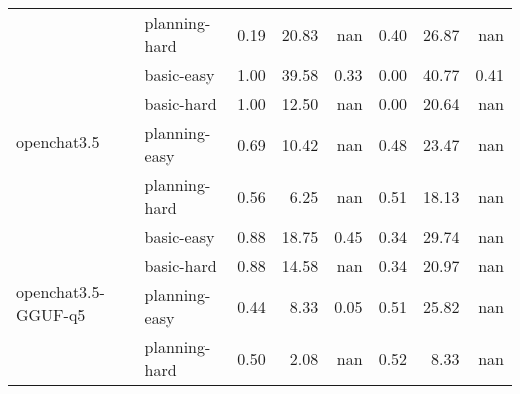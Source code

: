 \begin{tabular}{llrrrrrr}
 & planning-hard & 0.19 & 20.83 & nan & 0.40 & 26.87 & nan \\
\cline{1-8}
\multirow[c]{4}{*}{openchat3.5} & basic-easy & 1.00 & 39.58 & 0.33 & 0.00 & 40.77 & 0.41 \\
 & basic-hard & 1.00 & 12.50 & nan & 0.00 & 20.64 & nan \\
 & planning-easy & 0.69 & 10.42 & nan & 0.48 & 23.47 & nan \\
 & planning-hard & 0.56 & 6.25 & nan & 0.51 & 18.13 & nan \\
\cline{1-8}
\multirow[c]{4}{*}{openchat3.5-GGUF-q5} & basic-easy & 0.88 & 18.75 & 0.45 & 0.34 & 29.74 & nan \\
 & basic-hard & 0.88 & 14.58 & nan & 0.34 & 20.97 & nan \\
 & planning-easy & 0.44 & 8.33 & 0.05 & 0.51 & 25.82 & nan \\
 & planning-hard & 0.50 & 2.08 & nan & 0.52 & 8.33 & nan \\
\cline{1-8}
\hline
\end{tabular}
